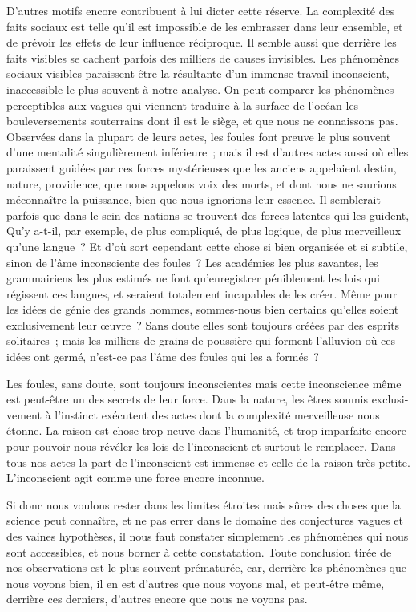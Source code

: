 \documentclass[french,twoside]{book} %
\begin{document}
D’autres motifs encore contribuent à lui dicter cette réserve. La complexité des faits sociaux est telle qu’il est impossible de les embrasser dans leur ensemble, et de prévoir les effets de leur influence réciproque. Il semble aussi que derrière les faits visibles se cachent parfois des milliers de causes invisibles. Les phénomènes sociaux visibles paraissent être la résultante d’un immense travail inconscient, inaccessible le plus souvent à notre analyse. On peut comparer les phénomènes perceptibles aux vagues qui viennent traduire à la surface de l’océan les bouleversements souterrains dont il est le siège, et que nous ne connaissons pas. Observées dans la plupart de leurs actes, les foules font preuve le plus souvent d’une mentalité singulièrement infé­rieure ; mais il est d’autres actes aussi où elles paraissent guidées par ces forces mystérieuses que les anciens appelaient destin, nature, providence, que nous appelons voix des morts, et dont nous ne saurions méconnaître la puissance, bien que nous ignorions leur essence. Il semblerait parfois que dans le sein des nations se trouvent des forces latentes qui les guident, Qu’y a-t-il, par exemple, de plus compliqué, de plus logique, de plus merveilleux qu’une langue ? Et d’où sort cependant cette chose si bien organisée et si subtile, sinon de l’âme inconsciente des foules ? Les académies les plus savantes, les grammairiens les plus estimés ne font qu’enregistrer pénible­ment les lois qui régissent ces langues, et seraient totalement incapables de les créer. Même pour les idées de génie des grands hommes, sommes-nous bien certains qu’elles soient exclusivement leur œuvre ? Sans doute elles sont toujours créées par des esprits solitaires ; mais les milliers de grains de poussière qui forment l’alluvion où ces idées ont germé, n’est-ce pas l’âme des foules qui les a formés ?\par
Les foules, sans doute, sont toujours inconscientes mais cette inconscience même est peut-être un des secrets de leur force. Dans la nature, les êtres soumis exclusi­vement à l’instinct exécutent des actes dont la complexité merveilleuse nous étonne. La raison est chose trop neuve dans l’humanité, et trop imparfaite encore pour pouvoir nous révéler les lois de l’inconscient et surtout le remplacer. Dans tous nos actes la part de l’inconscient est immense et celle de la raison très petite. L’inconscient agit comme une force encore inconnue.\par
Si donc nous voulons rester dans les limites étroites mais sûres des choses que la science peut connaître, et ne pas errer dans le domaine des conjectures vagues et des vaines hypothèses, il nous faut constater simplement les phénomènes qui nous sont accessibles, et nous borner à cette constatation. Toute conclusion tirée de nos obser­vations est le plus souvent prématurée, car, derrière les phénomènes que nous voyons bien, il en est d’autres que nous voyons mal, et peut-être même, derrière ces derniers, d’autres encore que nous ne voyons pas.
\end{document}
